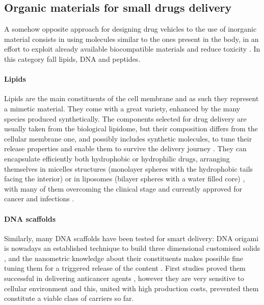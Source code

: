 \subsection{Organic materials for small drugs delivery}

A somehow opposite approach for designing drug vehicles to the use of inorganic material consists in using molecules similar to the ones present in the body, in an effort to exploit already available biocompatible materials and reduce toxicity \cite{Yoo2011}. In this category fall lipids, DNA and peptides.

\paragraph{Lipids} Lipids are the main constituents of the cell membrane and as such they represent a mimetic material. They come with a great variety, enhanced by the many species produced synthetically. The components selected for drug delivery are usually taken from the biological lipidome, but their composition differs from the cellular membrane one, and possibly includes synthetic molecules, to tune their release properties and enable them to survive the delivery journey \cite{Yingchoncharoen2016}. They can encapsulate efficiently both hydrophobic or hydrophilic drugs, arranging themselves in micelles structures (monolayer spheres with the hydrophobic tails facing the interior) or in liposomes (bilayer spheres with a water filled core) \cite{Bunker2016}, with many of them overcoming the clinical stage and currently approved for cancer and infections \cite{Pattni2015paper, Jain2017}.

\paragraph{DNA scaffolds} Similarly, many DNA scaffolds have been tested for smart delivery: DNA origami is nowadays an established technique to build three dimensional customised solids \cite{Linko2015}, and the nanometric knowledge about their constituents makes possible fine tuning them for a triggered release of the content \cite{Douglas2012}. First studies proved them successful in delivering anticancer agents \cite{Zhang2014, Jiang2012}, however they are very sensitive to cellular environment and this, united with high production costs, prevented them constitute a viable class of carriers so far.

